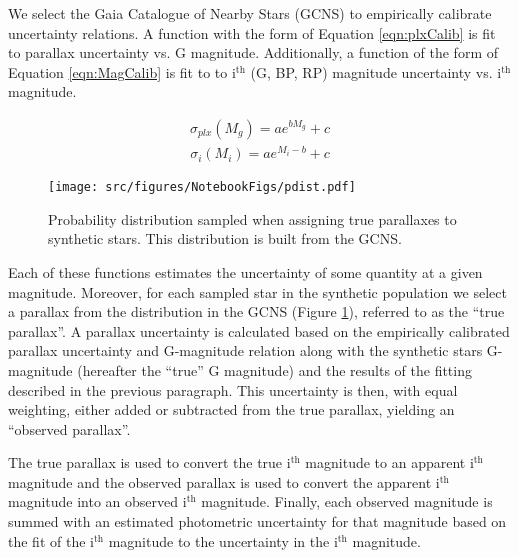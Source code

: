 We select the Gaia Catalogue of Nearby Stars (GCNS) \citep{GaiaCollaboration2021} to
empirically calibrate uncertainty relations. A function with the form of
Equation \ref{eqn:plxCalib} is fit to parallax uncertainty vs. G magnitude.
Additionally, a function of the form of Equation \ref{eqn:MagCalib} is fit to
to i$^{\text{th}}$ (G, BP, RP) magnitude uncertainty vs. i$^{\text{th}}$
magnitude.

\begin{align}\label{eqn:plxCalib}
	\sigma_{plx}(M_{g}) = ae^{bM_{g}}+c
\end{align}
\begin{align}\label{eqn:MagCalib}
	\sigma_{i}(M_{i}) = ae^{M_{i}-b}+c
\end{align}

\begin{figure}
	\centering
	\texttt{[image: src/figures/NotebookFigs/pdist.pdf]}
	\caption{Probability distribution sampled when assigning true parallaxes to
	synthetic stars. This distribution is built from the GCNS.}
	\label{fig:pdist}
\end{figure}

Each of these functions estimates the uncertainty of some quantity at a given
magnitude. Moreover, for each sampled star in the synthetic population we select a
parallax from the distribution in the GCNS (Figure \ref{fig:pdist}), referred
to as the ``true parallax''. A parallax uncertainty is calculated based on the
empirically calibrated parallax uncertainty and G-magnitude relation along with
the synthetic stars G-magnitude (hereafter the ``true'' G magnitude) and the
results of the fitting described in the previous paragraph. This uncertainty
is then, with equal weighting, either added or subtracted from the true
parallax, yielding an ``observed parallax''.

The true parallax is used to convert the true i$^{\text{th}}$ magnitude to an
apparent i$^{\text{th}}$ magnitude and the observed parallax is used to convert
the apparent i$^{\text{th}}$ magnitude into an observed i$^{\text{th}}$
magnitude. Finally, each observed magnitude is summed with an estimated
photometric uncertainty for that magnitude based on the fit of the
i$^{\text{th}}$ magnitude to the uncertainty in the i$^{\text{th}}$ magnitude.

